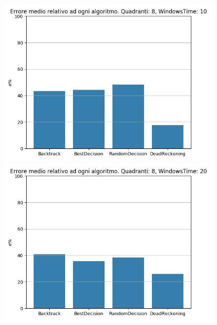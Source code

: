 \documentclass[12pt,a4paper,openright,twoside]{report}
\begin{document}
\begin{figure}[H]
\centering  
\includegraphics[scale=0.4]{secondChart8-10} 
\includegraphics[scale=0.4]{secondChart8-20} 
\end{figure}
\end{document}

